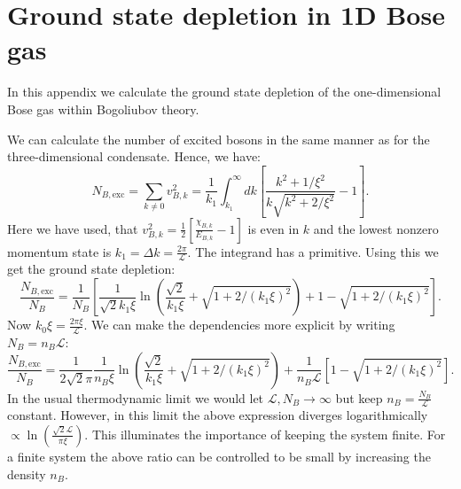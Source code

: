 \chapter{Ground state depletion in 1D Bose gas} %

\label{Appendix.groundstatedepletion.1DBosegas} 

In this appendix we calculate the ground state depletion of the one-dimensional Bose gas within Bogoliubov theory. 

We can calculate the number of excited bosons in the same manner as for the three-dimensional condensate. Hence, we have:
\begin{equation}
N_{B,\text{exc}} = \sum_{k\neq 0} v_{B,k}^2 = \frac{1}{k_1}\int_{k_1}^{\infty} dk \left[ \frac{k^2 + 1/\xi^2}{k\sqrt{k^2 + 2/\xi^2}} - 1 \right]. \nonumber
\end{equation}
Here we have used, that $v_{B,k}^2 = \frac{1}{2}\left[\frac{\chi_{B,k}}{E_{B,k}} - 1 \right]$ is even in $k$ and the lowest nonzero momentum state is $k_1 = \Delta k = \frac{2\pi}{\mathcal{L}}$. The integrand has a primitive. Using this we get the ground state depletion:
\begin{equation}
\frac{N_{B,\text{exc}}}{N_B} = \frac{1}{N_B}\left[\frac{1}{\sqrt{2}k_1\xi}\ln\left( \frac{ \sqrt{2} }{ k_1\xi } + \sqrt{ 1 + 2/(k_1\xi)^2 }\right) + 1 - \sqrt{ 1 + 2/(k_1\xi)^2 } \right]. \nonumber
\end{equation}
Now $k_0\xi = \frac{2\pi \xi}{\mathcal{L}}$. We can make the dependencies more explicit by writing $N_B = n_B \mathcal{L}$:
\begin{equation}
\frac{N_{B,\text{exc}}}{N_B} = \frac{1}{2\sqrt{2}\pi}\frac{1}{n_B\xi}\ln\left( \frac{ \sqrt{2} }{ k_1\xi } + \sqrt{ 1 + 2/(k_1\xi)^2 }\right) + \frac{1}{n_B\mathcal{L}}\left[1 - \sqrt{ 1 + 2/(k_1\xi)^2 } \right].
\label{eq.groundstatedepletion.1Dbosegas}
\end{equation}
In the usual thermodynamic limit we would let $\mathcal{L}, N_B \to \infty$ but keep $n_B = \frac{N_B}{\mathcal{L}}$ constant. However, in this limit the above expression diverges logarithmically $\propto \ln\left(\frac{\sqrt{2}\mathcal{L}}{\pi\xi} \right)$. This illuminates the importance of keeping the system finite. For a finite system the above ratio can be controlled to be small by increasing the density $n_B$. 
